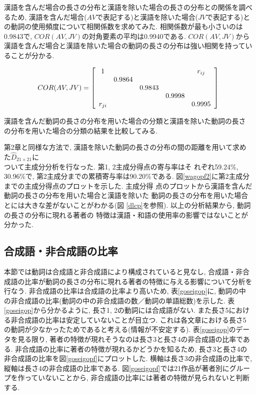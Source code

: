 漢語を含んだ場合の長さの分布と漢語を除いた場合の長さの分布との関係を調べるため, 漢語を含んだ場合($AV$で表記する)と漢語を除いた場合($JV$で表記する)との動詞の使用頻度について相関係数を求めてみた. 相関係数が最も小さいのは0.9843で, 
$COR(AV, JV)$の対角要素の平均は0.9940である. $COR(AV, JV)$から漢語を含んだ場合と漢語を除いた場合の動詞の長さの分布は強い相関を持っていることが分かる. 

\[ COR(AV, JV)=\left[ \begin{array}{ccccc}
1    &       &       &       &  \Large{r_{ij}}\\
     &0.9864 &       &       &        \\
     &       &0.9843 &       &        \\
     &       &       &0.9998 &         \\
\Large{r_{ji}}     &      &       &       &0.9995  \\
\end{array} \right] \]

漢語を含んだ動詞の長さの分布を用いた場合の分類と漢語を除いた動詞の長さ
の分布を用いた場合の分類の結果を比較してみる. 

第2章と同様な方法で, 漢語を除いた動詞の長さの分布の間の距離を用いて求めた$\widehat{D}_{21\times 21}$に\\ついて主成分分析を行なった. 第1, 2主成分得点の寄与率はそ
れぞれ59.24\%,  30.96\%で, 第2主成分までの累積寄与率は90.20\%である. 
図\ref{wagopf2}に第2主成分までの主成分得点のプロットを示した. 主成分得
点のプロットから漢語を含んだ動詞の長さの分布を用いた場合と漢語を除いた
動詞の長さの分布を用いた場合とには大きな差がないことがわかる(図
\ref{dlcp}を参照). 以上の分析結果から, 動詞の長さの分布に現れる著者の
特徴は漢語・和語の使用率の影響ではないことが分かった.  

\subsection{合成語・非合成語の比率}
本節では動詞は合成語と非合成語により構成されていると見なし, 合成語・非合成語の比率が動詞の長さの分布に現れる著者の特徴に与える影響について分析を行なう. 非合成語の比率は合成語の比率より高いため, 表\ref{goseigop}に, 動詞の中の非合成語の比率(動詞の中の非合成語の数／動詞の単語総数)を示した. 表\ref{goseigop}から分かるように, 長さ1, 2の動詞には合成語がない. また長さ5における非合成語の比率は安定していないことが目立つ. これは各文章における長さ5の動詞が少なかったためであると考える(情報が不安定する). 表\ref{goseigop}のデータを見る限り, 著者の特徴が現れそうなのは長さ3と長さ4の非合成語の比率である. 非合成語の比率に著者の特徴が現れるかどうかを知るため, 長さ3と長さ4の非合成語の比率を図\ref{goseigopf}にプロットした. 横軸は長さ3の非合成語の比率で, 縦軸は長さ4の非合成語の比率である. 図\ref{goseigopf}では21作品が著者別にグループを作っていないことから, 非合成語の比率には著者の特徴が見られないと判断する. 

